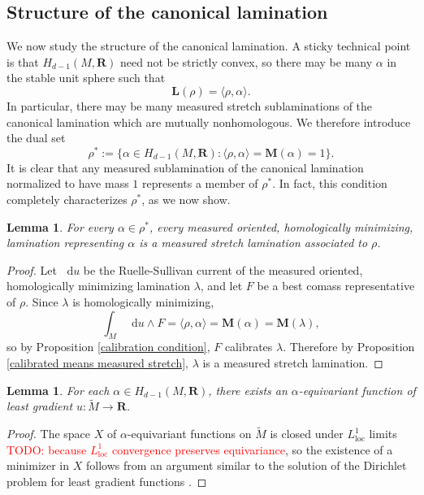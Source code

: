 \documentclass[reqno,11pt]{amsart}
\newcommand{\RR}{\mathbf{R}}
\newcommand*\dif{\mathop{}\!\mathrm{d}}
\newcommand{\Mass}{\mathbf M}
\newcommand{\Comass}{\mathbf L}
\newcommand{\loc}{\mathrm{loc}}
\newtheorem{lemma}[theorem]{Lemma}
\theoremstyle{definition}
\numberwithin{equation}{section}
\newcommand\todo[1]{\textcolor{red}{TODO: #1}}
\begin{document}
\subsection{Structure of the canonical lamination}\label{canonical structure}
We now study the structure of the canonical lamination.
A sticky technical point is that $H_{d - 1}(M, \RR)$ need not be strictly convex, so there may be many $\alpha$ in the stable unit sphere such that 
\begin{equation}\label{flats duality}
\Comass(\rho) = \langle \rho, \alpha\rangle.
\end{equation}
In particular, there may be many measured stretch sublaminations of the canonical lamination which are mutually nonhomologous.
We therefore introduce the dual set 
$$\rho^* := \{\alpha \in H_{d - 1}(M, \RR): \langle \rho, \alpha\rangle = \Mass(\alpha) = 1\}.$$
It is clear that any measured sublamination of the canonical lamination normalized to have mass $1$ represents a member of $\rho^*$.
In fact, this condition completely characterizes $\rho^*$, as we now show.

\begin{lemma}\label{homologically minimizing means measured stretch}
For every $\alpha \in \rho^*$, every measured oriented, homologically minimizing, lamination representing $\alpha$ is a measured stretch lamination associated to $\rho$.
\end{lemma}
\begin{proof}
Let $\dif u$ be the Ruelle-Sullivan current of the measured oriented, homologically minimizing lamination $\lambda$, and let $F$ be a best comass representative of $\rho$.
Since $\lambda$ is homologically minimizing,
$$\int_M \dif u \wedge F = \langle \rho, \alpha\rangle = \Mass(\alpha) = \Mass(\lambda),$$
so by Proposition \ref{calibration condition}, $F$ calibrates $\lambda$.
Therefore by Proposition \ref{calibrated means measured stretch}, $\lambda$ is a measured stretch lamination.
\end{proof}

\begin{lemma}\label{existence for least gradient}
For each $\alpha \in H_{d - 1}(M, \RR)$, there exists an $\alpha$-equivariant function of least gradient $u: \tilde M \to \RR$.
\end{lemma}
\begin{proof}
The space $X$ of $\alpha$-equivariant functions on $\tilde M$ is closed under $L^1_\loc$ limits \todo{because $L^1_\loc$ convergence preserves equivariance}, so the existence of a minimizer in $X$ follows from an argument similar to the solution of the Dirichlet problem for least gradient functions \cite[Theorem 1.20]{Giusti77}.
\end{proof}
\end{document}
